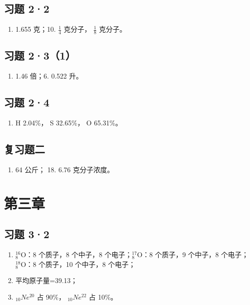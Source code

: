 \subsection{习题 2·2}

\begin{enumerate}[start=9]
\item
  1.655 克；10. \(\frac{1}{4}\) 克分子， \(\frac{1}{8}\) 克分子。
\end{enumerate}

\subsection{习题 2·3（1）}

\begin{enumerate}[start=5]
\item
  1.46 倍；6. 0.522 升。
\end{enumerate}

\subsection{习题 2·4}

\begin{enumerate}
\item
  H 2.04\%， S 32.65\%， O 65.31\%。
\end{enumerate}

\subsection{复习题二}

\begin{enumerate}[start=17]
\item
  64 公斤； 18. 6.76 克分子浓度。
\end{enumerate}

\section{第三章}

\subsection{习题 3·2}

\begin{enumerate}[start=7]
\item
  \(_{8}^{16}\mathrm{O}\)：8 个质子，8 个中子，8
  个电子；\(_{8}^{17}\mathrm{O}\)：8 个质子，9 个中子，8
  个电子；\(_{8}^{18}\mathrm{O}\)：8 个质子，10 个中子，8 个电子；
\item
  平均原子量=39.13；
\item
  \(_{10}Ne^{20}\) 占 90\%， \(_{10}Ne^{22}\) 占 10\%。
\end{enumerate}

